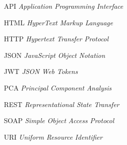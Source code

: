 \begin{siglas}
  \item[API] \textit{Application Programming Interface}
  \item[HTML] \textit{HyperText Markup Language}
  \item[HTTP] \textit{Hypertext Transfer Protocol}
  \item[JSON] \textit{JavaScript Object Notation}
  \item[JWT] \textit{JSON Web Tokens}
  \item[PCA] \textit{Principal Component Analysis}
  \item[REST] \textit{Representational State Transfer}
  \item[SOAP] \textit{Simple Object Access Protocol}
  \item[URI] \textit{Uniform Resource Identifier}
\end{siglas}
